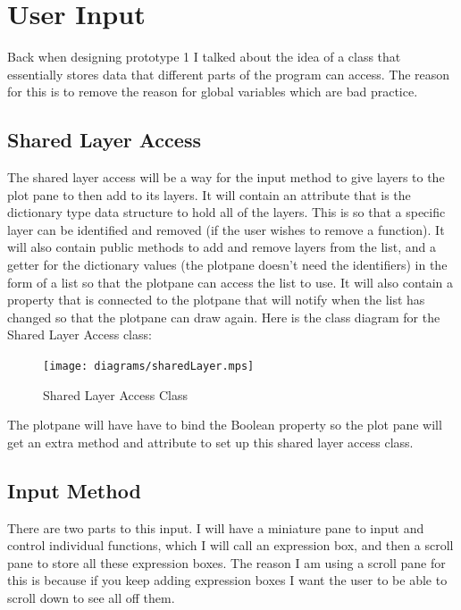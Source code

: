 \documentclass[../../../../main.tex]{subfiles}
\begin{document}
\section{User Input}
Back when designing prototype 1 I talked about the idea of a class that essentially stores data that different parts of the program can access. The reason for this is to remove the reason for global variables which are bad practice.
\subsection{Shared Layer Access}
The shared layer access will be a way for the input method to give layers to the plot pane to then add to its layers. It will contain an attribute that is the dictionary type data structure to hold all of the layers. This is so that a specific layer can be identified and removed (if the user wishes to remove a function). It will also contain public methods to add and remove layers from the list, and a getter for the dictionary values (the plotpane doesn't need the identifiers) in the form of a list so that the plotpane can access the list to use. It will also contain a property that is connected to the plotpane that will notify when the list has changed so that the plotpane can draw again. Here is the class diagram for the Shared Layer Access class:
\begin{figure}[H]
	\centering
	\texttt{[image: diagrams/sharedLayer.mps]}
	\caption{Shared Layer Access Class}
\end{figure}
The plotpane will have have to bind the Boolean property so the plot pane will get an extra method and attribute to set up this shared layer access class.
\newpage
\subsection{Input Method}
There are two parts to this input. I will have a miniature pane to input and control individual functions, which I will call an expression box, and then a scroll pane to store all these expression boxes. The reason I am using a scroll pane for this is because if you keep adding expression boxes I want the user to be able to scroll down to see all off them.
\end{document}

